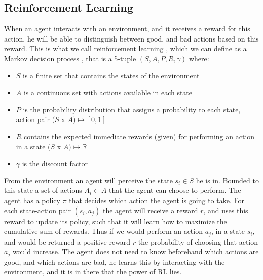 \documentclass[a4paper,12pt]{article}
\begin{document}
\subsection{Reinforcement Learning}
When an agent interacts with an environment, and it receives a reward for this action, he will be able to distinguish between good, and bad actions based on this reward. This is what we call reinforcement learning \cite{sutton1998rl}, which we can define as a Markov decision process \cite{howard1960mdp}, that is a 5-tuple $(S, A, P, R, \gamma)$ where:
\begin{itemize}
\item $S$ is a finite set that contains the states of the environment
\item $A$ is a continuous set with actions available in each state
\item $P$ is the probability distribution that assigns a probability to each state, action pair $(S$ x $A) \mapsto [0,1]$
\item $R$ contains the expected immediate rewards (given) for performing an action in a state $(S$ x $A) \mapsto \mathbb{R}$
\item $\gamma$ is the discount factor
\end{itemize}
From the environment an agent will perceive the state $s_{i} \in S$ he is in. Bounded to this state a set of actions $A_{i} \subset A$ that the agent can choose to perform. The agent has a policy $\pi$ that decides which action the agent is going to take. For each state-action pair $(s_{i}, a_{j})$ the agent will receive a reward $r$, and uses this reward to update its policy, such that it will learn how to maximize the cumulative sum of rewards. Thus if we would perform an action $a_{j}$, in a state $s_{i}$, and would be returned a positive reward $r$ the probability of choosing that action $a_{j}$ would increase. The agent does not need to know beforehand which actions are good, and which actions are bad, he learns this by interacting with the environment, and it is in there that the power of RL lies.
\end{document}
